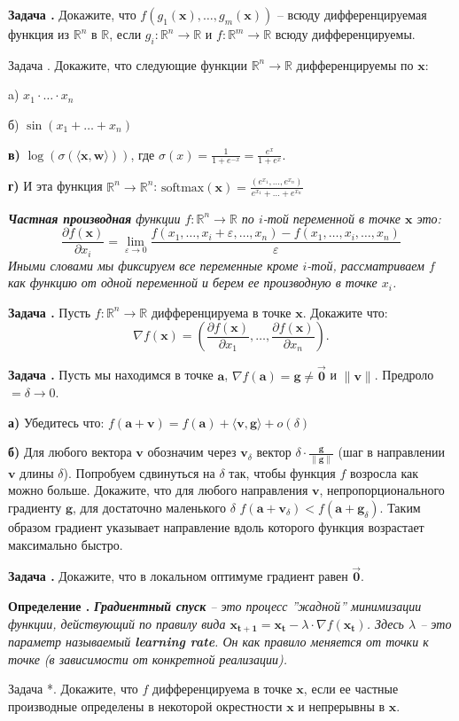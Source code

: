 \documentclass[12pt,a4paper]{article}
\def\R{\mathbb{R}}
\newcounter{znum}
\newcommand{\zz}[1]{\addtocounter{znum}{1} \textbf{Задача \arabic{znum}#1. }}
\newcommand{\z}[1]{\addtocounter{znum}{1} Задача \arabic{znum}#1. }
\newcounter{defnum}
\newcommand{\df}[1]{\addtocounter{defnum}{1} \textbf{Определение \arabic{defnum}.} {\it #1}}
\begin{document}
\zz{} Докажите, что $f(g_1(\mathbf{x}), \ldots, g_m(\mathbf{x}))$ -- всюду дифференцируемая функция из $\R^n$ в $\R$, если $g_i: \R^n \to \R$ и $f: \R^m \to \R$ всюду дифференцируемы.

\z{} Докажите, что следующие функции $\R^n \to \R$ дифференцируемы по $\mathbf{x}$: \par
a) $x_1 \cdot \ldots \cdot x_n$ \par
б) $\sin(x_1 + \ldots + x_n)$ \par
\textbf{в)} $\log(\sigma(\langle \mathbf{x}, \mathbf{w} \rangle))$, где $\sigma(x) = \frac{1}{1 + e^{-x}} = \frac{e^{x}}{1 + e^{x}}.$\par
\textbf{г)} И эта функция $\R^n \to \R^n$: $\mathrm{softmax}(\mathbf{x}) = \frac{(e^{x_1}, \ldots, e^{x_n})}{e^{x_1} + \ldots + e^{x_n}}$\par

{\it \textbf{Частная производная} функции $f : \R^n \to \R$ по $i$-той переменной в точке $\mathbf{x}$ это:
$$ \frac{\partial f(\mathbf{x})}{\partial x_i} = \lim_{\varepsilon \to 0} \frac{f(x_1, \ldots, x_i + \varepsilon,\ldots, x_n) - f(x_1, \ldots, x_i,\ldots, x_n)}{\varepsilon} $$
Иными словами мы фиксируем все переменные кроме $i$-той, рассматриваем $f$ как функцию от одной переменной и берем ее производную в точке $x_i$.
}

\zz{} Пусть $f : \R^n \to \R$ дифференцируема в точке $\mathbf{x}$. Докажите что:
$$ \nabla f(\mathbf{x}) = \left(\frac{\partial f(\mathbf{x})}{\partial x_1}, \ldots, \frac{\partial f(\mathbf{x})}{\partial x_n}\right) .$$

\zz{} Пусть мы находимся в точке $\mathbf{a}$, $\nabla f(\mathbf{a}) = \mathbf{g} \ne \overrightarrow{\mathbf{0}}$
 и $\| \mathbf{v} \|$. Предроло $ = \delta \to 0$.

\textbf{а)} Убедитесь что: $ f(\mathbf{a} + \mathbf{v}) = f(\mathbf{a}) + \langle \mathbf{v}, \mathbf{g} \rangle + o(\delta)$\par
\textbf{б)} Для любого вектора $\mathbf{v}$ обозначим через $\mathbf{v}_\delta$ вектор $\delta \cdot \frac{\mathbf{g}}{\|\mathbf{g}\|}$ (шаг в направлении $\mathbf{v}$ длины $\delta$). Попробуем сдвинуться на $\delta$ так, чтобы функция $f$ возросла как можно больше. Докажите, что для любого направления $\mathbf{v}$, непропорционального градиенту $\mathbf{g}$,  для достаточно маленького $\delta$ $f(\mathbf{a} + \mathbf{v}_\delta) < f(\mathbf{a} + \mathbf{g}_\delta)$. Таким образом градиент указывает направление вдоль которого функция возрастает максимально быстро.

\zz{} Докажите, что в локальном оптимуме градиент равен $\overrightarrow{\mathbf{0}}$.

\df{\textbf{Градиентный спуск} -- это процесс ''жадной'' минимизации функции, действующий по правилу вида $\mathbf{x_{t + 1}} = \mathbf{x_{t}} - \lambda \cdot \nabla f(\mathbf{x_{t}})$. Здесь $\lambda$ -- это параметр называемый \textbf{learning rate}. Он как правило меняется от точки к точке (в зависимости от конкретной реализации).}

\z{*} Докажите, что $f$ дифференцируема в точке $\mathbf{x}$, если ее частные производные определены в некоторой окрестности $\mathbf{x}$ и непрерывны в $\mathbf{x}$.
\end{document}
